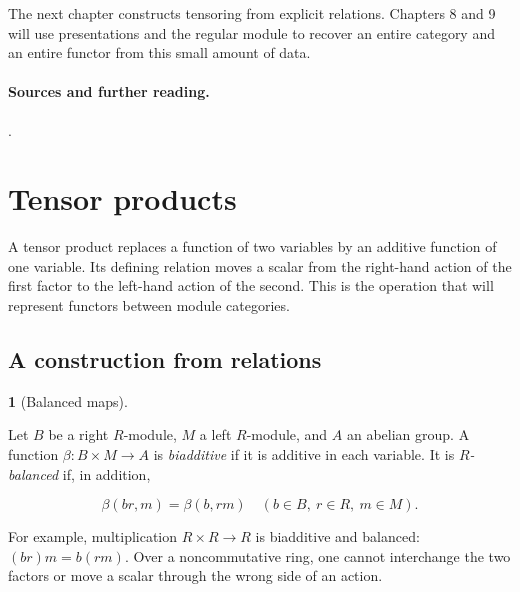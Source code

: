 \documentclass[11pt,a4paper]{article}
\newcommand{\mathheading}{}
\theoremstyle{plain}
\theoremstyle{definition}
\newtheorem*{definitionstatement}{\mathheading}
\newenvironment{mathdefinition}[3]{\renewcommand{\mathheading}{#1 #2}\begin{definitionstatement}[#3]}{\end{definitionstatement}}
\begin{document}
The next chapter constructs tensoring from explicit relations. Chapters 8 and 9 will use presentations and the regular module to recover an entire category and an entire functor from this small amount of data.

 
\paragraph{Sources and further reading.}
\cite[\S\S1.1--1.7, 3.7--3.8]{crawley}.

\section{Tensor products}
\label{chapter-06}
  
A tensor product replaces a function of two variables by an additive function of one variable. Its defining relation moves a scalar from the right-hand action of the first factor to the left-hand action of the second. This is the operation that will represent functors between module categories.

 
\subsection{A construction from relations}
\label{construction}
 
\begin{mathdefinition}{Definition}{6.1}{Balanced maps}
\label{env-6-1}

Let \(B\) be a right \(R\)-module, \(M\) a left \(R\)-module, and \(A\) an abelian group. A function \(\beta:B\times M\to A\) is \emph{biadditive} if it is additive in each variable. It is \emph{\(R\)-balanced} if, in addition,

 \[\beta(br,m)=\beta(b,rm)\quad(b\in B,\ r\in R,\ m\in M).\] 
\par{}\par

\end{mathdefinition}
 
For example, multiplication \(R\times R\to R\) is biadditive and balanced: \((br)m=b(rm)\). Over a noncommutative ring, one cannot interchange the two factors or move a scalar through the wrong side of an action.
\end{document}
